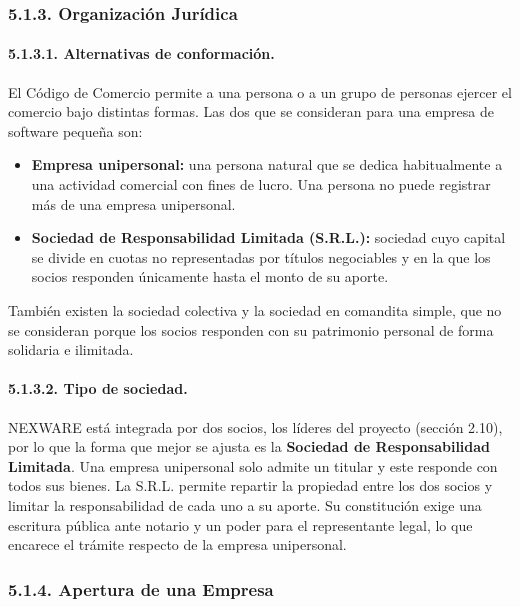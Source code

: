 \subsubsection{5.1.3. Organización Jurídica}

\paragraph{5.1.3.1. Alternativas de conformación.}

El Código de Comercio \parencite{codigocomercio1977} permite a una persona o a un grupo de personas ejercer el comercio bajo distintas formas. Las dos que se consideran para una empresa de software pequeña son:

\begin{itemize}
    \item \textbf{Empresa unipersonal:} una persona natural que se dedica habitualmente a una actividad comercial con fines de lucro. Una persona no puede registrar más de una empresa unipersonal.
    \item \textbf{Sociedad de Responsabilidad Limitada (S.R.L.):} sociedad cuyo capital se divide en cuotas no representadas por títulos negociables y en la que los socios responden únicamente hasta el monto de su aporte.
\end{itemize}

También existen la sociedad colectiva y la sociedad en comandita simple, que no se consideran porque los socios responden con su patrimonio personal de forma solidaria e ilimitada.

\paragraph{5.1.3.2. Tipo de sociedad.}

NEXWARE está integrada por dos socios, los líderes del proyecto (sección 2.10), por lo que la forma que mejor se ajusta es la \textbf{Sociedad de Responsabilidad Limitada}. Una empresa unipersonal solo admite un titular y este responde con todos sus bienes. La S.R.L. permite repartir la propiedad entre los dos socios y limitar la responsabilidad de cada uno a su aporte. Su constitución exige una escritura pública ante notario y un poder para el representante legal, lo que encarece el trámite respecto de la empresa unipersonal.

\subsubsection{5.1.4. Apertura de una Empresa}

